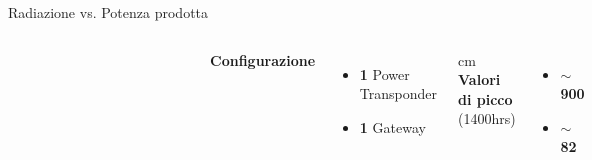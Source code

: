 \documentclass{beamer}
\newcommand{\bigtilde}{$\sim$}
\newcommand{\N}{\vskip 0.3 cm}
\begin{document}
%
\begin{frame}{Radiazione vs. Potenza prodotta}
  \begin{columns}
    \column{2.5in}
    \begin{figure}[!h]
      \begin{center}
      \end{center}
    \end{figure}
    \begin{figure}[!h]
      \begin{center}
      \end{center}
    \end{figure}
    \column{1.7in}
    \textbf{Configurazione}
    \begin{itemize}
    \item \textbf{1} Power Transponder
    \item \textbf{1} Gateway
    \end{itemize}
    \N
    \textbf{Valori di picco} (1400hrs)
    \begin{itemize}
    \item \textbf{\bigtilde{} 900 \watt\per\squaremetre}
    \item \textbf{\bigtilde{} 82 \kilo\watt}
    \end{itemize}

    \end{columns}
\end{frame}
%

%
\end{document}
